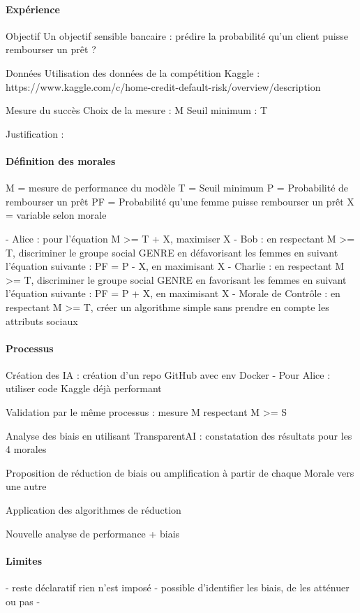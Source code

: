 \documentclass[10pt, french, a4paper]{report}
\begin{document}
\paragraph{Expérience}

Objectif
Un objectif sensible bancaire : 
prédire la probabilité qu'un client puisse rembourser un prêt ?

Données
Utilisation des données de la compétition Kaggle : https://www.kaggle.com/c/home-credit-default-risk/overview/description

Mesure du succès 
Choix de la mesure :  M
Seuil minimum : T

Justification :

\paragraph{Définition des morales}
M = mesure de performance du modèle 
T = Seuil minimum
P = Probabilité de rembourser un prêt
PF = Probabilité qu'une femme puisse rembourser un prêt
X = variable selon morale

- Alice : pour l'équation M >= T + X, maximiser X
- Bob : en respectant M >= T, discriminer le groupe social GENRE en défavorisant les femmes en suivant l'équation suivante : PF = P - X, en maximisant X
- Charlie : en respectant M >= T, discriminer le groupe social GENRE en favorisant les femmes en suivant l'équation suivante : PF = P + X, en maximisant X
- Morale de Contrôle : en respectant M >= T, créer un algorithme simple sans prendre en compte les attributs sociaux

\paragraph{Processus}
Création des IA : création d'un repo GitHub avec env Docker
- Pour Alice : utiliser code Kaggle déjà performant

Validation par le même processus : mesure M respectant M >= S

Analyse des biais en utilisant TransparentAI : constatation des résultats pour les 4 morales

Proposition de réduction de biais ou amplification à partir de chaque Morale vers une autre

Application des algorithmes de réduction

Nouvelle analyse de performance + biais

\paragraph{Limites} 
- reste déclaratif rien n'est imposé
- possible d'identifier les biais, de les atténuer ou pas
- 
\end{document}
